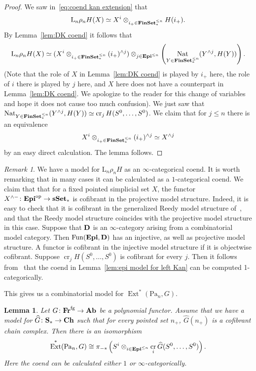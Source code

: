 \documentclass[psamsfonts]{amsart}
\theoremstyle{plain}
\newtheorem{lem}[thm]{Lemma}
\theoremstyle{definition}
\theoremstyle{remark}
\newtheorem{rem}[thm]{Remark}
\newcommand{\catname}[1]{{\normalfont\textbf{#1}}}
\newcommand{\op}{{\mathrm{op}}}
\newcommand{\finset}{\catname{FinSet}_*}
\newcommand{\epi}{\catname{Epi}}
\newcommand{\sset}{\catname{sSet}}
\newcommand{\spaces}{\catname{S}_*}
\newcommand{\fr}{\allfr^{\mathrm{fg}}}
\newcommand{\allfr}{\catname{Fr}}
\newcommand{\ab}{\catname{Ab}}
\newcommand{\ch}{\catname{Ch}}
\newcommand{\lkan}{\mathrm{L}}
\newcommand{\Passi}{\mathrm{Pa}}
\DeclareMathOperator{\ext}{Ext}
\DeclareMathOperator{\nat}{Nat}
\DeclareMathOperator{\fun}{Fun}
\DeclareMathOperator{\ce}{cr}
\begin{document}
\begin{proof}
    We saw in~\eqref{eq:coend kan extension} that 
 \[
\lkan_n\rho_n H(X) \simeq X^{i} \otimes_{i_+\in \finset^{\le n}} H(i_+).
\]   
By Lemma~\ref{lem:DK coend} it follows that
 \[
\lkan_n\rho_n H(X) \simeq (X^{i} \otimes_{i_+\in \finset^{\le n}} (i_+)^{\wedge j}) \otimes_{j\in \epi^{\le n}} \left(\nat_{Y\in \finset^{\le n}}(Y^{\wedge j}, H(Y))\right).
\]   
(Note that the role of $X$ in Lemma~\ref{lem:DK coend} is played by $i_+$ here, the role of $i$ there is played by $j$ here, and $X$ here does not have a counterpart in Lemma~\ref{lem:DK coend}. We apologize to the reader for this change of variables and hope it does not cause too much confusion).
We just saw that $\nat_{Y\in \finset^{\le n}}(Y^{\wedge j}, H(Y))\simeq \ce_jH(S^0, \ldots,S^0)$. We claim that for $j\le n$ there is an equivalence
\[
X^{i} \otimes_{i_+\in \finset^{\le n}} (i_+)^{\wedge j}\simeq X^{\wedge j}
\]
by an easy direct calculation. The lemma follows.
\end{proof}
\begin{rem}\label{rem:strict coend}
We have a model for $\lkan_n\rho_n H$ as an $\infty$-categorical coend. It is worth remarking that in many cases it can be calculated as a $1$-categorical coend. We claim that that for a fixed pointed simplicial set $X$, the functor $X^{\wedge -}\colon\epi^{\op}\to \sset_*$ is cofibrant in the projective model structure. Indeed, it is easy to check that it is cofibrant in the generalized Reedy model structure of~\cite{Berger-Moerdijk}, and that the Reedy model structure coincides with the projective model structure in this case. Suppose that $\catname{D}$ is an $\infty$-category arising from a combinatorial model category. Then $\fun(\epi, \catname{D})$ has an injective, as well as projective model structure. A functor is cofibrant in the injective model structure if it is objectwise cofibrant. Suppose $\ce_jH(S^0, \ldots, S^0)$ is cofibrant for every $j$. Then it follows from~\cite[Remark A.2.9.27]{LurieHTT} that the coend in Lemma~\ref{lem:epi model for left Kan} can be computed 1-categorically.
\end{rem}
This gives us a combinatorial model for $\ext^*(\Passi_n, G)$.
\begin{lem}\label{lem:ext passi strict coend}
Let $G\colon \fr\to \ab$ be a polynomial functor. Assume that we have a model for $\widehat G\colon \spaces\to \ch$ such that for every pointed set $n_+$, $\widehat G(n_+)$ is a cofibrant chain complex. Then there is an isomorphism
\[
\ext^*(\Passi_n, G)\cong \pi_{-*}\left(S^i \otimes_{i\in \epi^{\le n}} \ce_i\widehat G(S^0, \ldots, S^0)\right).
\]
Here the coend can be calculated either $1$ or $\infty$-categorically.
\end{lem}
\end{document}
